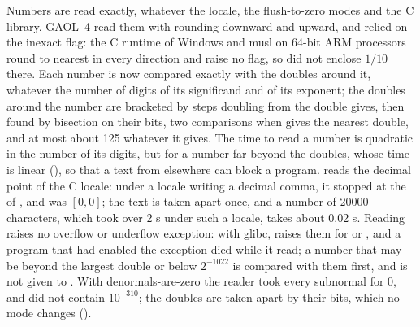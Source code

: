 Numbers are read exactly, whatever the locale, the flush-to-zero modes and
the C library.\newinvfive{} GAOL~4 read them with  rounding
downward and upward, and relied on the inexact flag: the C runtime of Windows
and musl on 64-bit ARM processors round to nearest in every direction and
raise no flag, so  did not enclose $1/10$ there. Each
number is now compared exactly with the doubles around it, whatever the
number of digits of its significand and of its exponent; the doubles around
the number are bracketed by steps doubling from the double 
gives, then found by bisection on their bits, two comparisons when
 gives the nearest double, and at most about 125 whatever it
gives. The time to read a number is quadratic in the number of its digits, but for a
number far beyond the doubles, whose time is linear
(), so that a text from elsewhere can block a
program.
 reads the decimal point of the C locale: under a locale
writing a decimal comma, it stopped at the  of , and
 was $[0, 0]$; the text is taken apart once, and a
number of 20000 characters, which took over 2 s under such a locale, takes
about 0.02 s. Reading raises no overflow or underflow exception: with glibc,
 raises them for  or , and a program
that had enabled the exception died while it read; a number that may be
beyond the largest double or below $2^{-1022}$ is compared with them first,
and is not given to . With denormals-are-zero the reader took
every subnormal for 0, and  did not contain
$10^{-310}$; the doubles are taken apart by their bits, which no mode
changes ().

